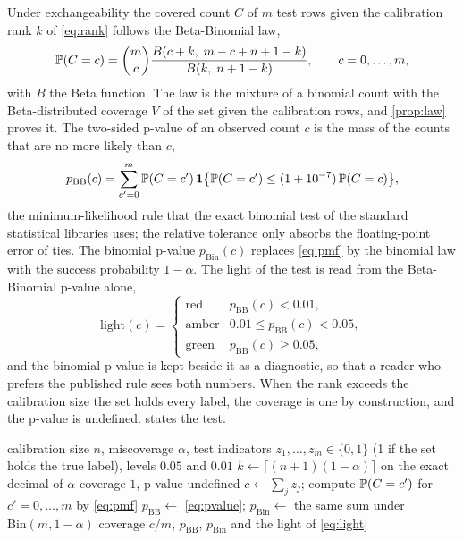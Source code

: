 Under exchangeability the covered count $C$ of $m$ test rows given the calibration rank $k$ of \cref{eq:rank} follows the Beta-Binomial law,
\begin{equation}
\mathbb{P}(C=c)=\binom{m}{c}\frac{B(c+k,\;m-c+n+1-k)}{B(k,\;n+1-k)},\qquad c=0,\dots,m,
\label{eq:pmf}
\end{equation}
with $B$ the Beta function. The law is the mixture of a binomial count with the Beta-distributed coverage $V$ of the set given the calibration rows, and \cref{prop:law} proves it. The two-sided p-value of an observed count $c$ is the mass of the counts that are no more likely than $c$,
\begin{equation}
p_{\mathrm{BB}}(c)=\sum_{c'=0}^{m}\mathbb{P}(C=c')\,\mathbf{1}\bigl\{\mathbb{P}(C=c')\le(1+10^{-7})\,\mathbb{P}(C=c)\bigr\},
\label{eq:pvalue}
\end{equation}
the minimum-likelihood rule that the exact binomial test of the standard statistical libraries uses; the relative tolerance only absorbs the floating-point error of ties. The binomial p-value $p_{\mathrm{Bin}}(c)$ replaces \cref{eq:pmf} by the binomial law with the success probability $1-\alpha$. The light of the test is read from the Beta-Binomial p-value alone,
\begin{equation}
\text{light}(c)=\begin{cases}\text{red}&p_{\mathrm{BB}}(c)<0.01,\\ \text{amber}&0.01\le p_{\mathrm{BB}}(c)<0.05,\\ \text{green}&p_{\mathrm{BB}}(c)\ge 0.05,\end{cases}
\label{eq:light}
\end{equation}
and the binomial p-value is kept beside it as a diagnostic, so that a reader who prefers the published rule sees both numbers. When the rank exceeds the calibration size the set holds every label, the coverage is one by construction, and the p-value is undefined.  states the test.

\begin{algorithm}[htbp]
\caption{Coverage test of a split-conformal set with the Beta-Binomial law.}
\label{alg:coverage}
\begin{algorithmic}[1]
\Require calibration size $n$, miscoverage $\alpha$, test indicators $z_1,\dots,z_m\in\{0,1\}$ (1 if the set holds the true label), levels $0.05$ and $0.01$
\State $k\gets\lceil (n+1)(1-\alpha)\rceil$ on the exact decimal of $\alpha$
 \Return coverage $1$, p-value undefined \EndIf
\State $c\gets\sum_j z_j$; compute $\mathbb{P}(C=c')$ for $c'=0,\dots,m$ by \cref{eq:pmf}
\State $p_{\mathrm{BB}}\gets$ \cref{eq:pvalue}; $p_{\mathrm{Bin}}\gets$ the same sum under $\mathrm{Bin}(m,1-\alpha)$
\State \Return coverage $c/m$, $p_{\mathrm{BB}}$, $p_{\mathrm{Bin}}$ and the light of \cref{eq:light}
\end{algorithmic}
\end{algorithm}

